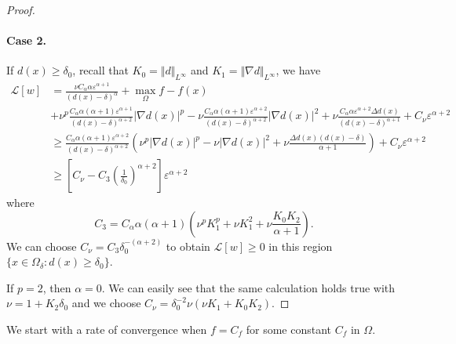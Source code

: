 \documentclass[11pt,reqno]{amsart}
\numberwithin{figure}{section}
\theoremstyle{plain}
\newtheorem{thm}{Theorem}[section]
\theoremstyle{remark}
\numberwithin{equation}{section}
\newcommand{\R}{\mathbb{R}}
\begin{document}
\begin{proof}
\paragraph{\textbf{Case 2.}} If $d(x)\geq \delta_0$, recall that $K_0 = \Vert d\Vert_{L^\infty}$ and $K_1 = \Vert \nabla d\Vert_{L^\infty}$, we have
\begin{align*}
    \mathcal{L}[w] &= \frac{\nu C_\alpha\alpha\varepsilon^{\alpha+1}}{(d(x)-\delta)^\alpha} + \max_{\Omega} f - f(x)\\
    &+  \nu^p\frac{C_\alpha\alpha(\alpha+1)\varepsilon^{\alpha+1}}{(d(x)-\delta)^{\alpha+2}}|\nabla d(x)|^p - \nu \frac{C_\alpha \alpha(\alpha+1)\varepsilon^{\alpha+2}}{(d(x)-\delta)^{\alpha+2}}|\nabla d(x)|^2 
    + \nu \frac{C_\alpha \alpha \varepsilon^{\alpha+2}\Delta d(x)}{(d(x)-\delta)^{\alpha+1}} + C_\nu \varepsilon^{\alpha+2}\\
    &\geq \frac{C_\alpha \alpha(\alpha+1)\varepsilon^{\alpha+2}}{(d(x)-\delta)^{\alpha+2}}\left(\nu^p|\nabla d(x)|^p - \nu |\nabla d(x)|^2 + \nu \frac{\Delta d(x)(d(x)-\delta)}{\alpha+1}\right) + C_\nu \varepsilon^{\alpha+2}\\
    &\geq \left[C_\nu - C_3\left(\frac{1}{\delta_0}\right)^{\alpha+2}\right]\varepsilon^{\alpha+2}
\end{align*}
where 
\begin{equation*}
    C_3 = C_\alpha\alpha(\alpha+1) \left(\nu^pK_1^p + \nu K_1^2 + \nu \frac{K_0K_2}{\alpha+1}\right).
\end{equation*}
We can choose $C_\nu = C_3\delta_0^{-(\alpha+2)}$ to obtain $\mathcal{L}[w]\geq 0$ in this region $\{x\in \Omega_\delta:d(x)\geq \delta_0\}$. 
\smallskip

\noindent
If $p=2$, then $\alpha = 0$. We can easily see that the same calculation holds true with $\nu = 1+K_2\delta_0$ and we choose $C_\nu = \delta_0^{-2}\nu (\nu K_1+K_0K_2)$.
\end{proof}

We start with a rate of convergence when $f = C_f$ for some constant $C_f$ in $\Omega$.
\end{document}
